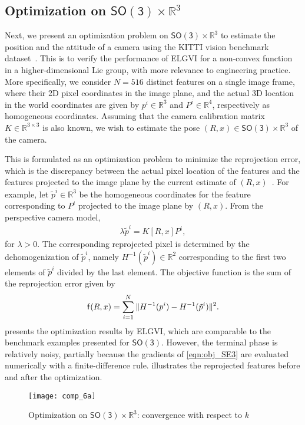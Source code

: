 \documentclass[letterpaper, 10pt, conference]{ieeeconf}
\newcommand{\SO}{\ensuremath{\mathsf{SO(3)}}}
\renewcommand{\Re}{\ensuremath{\mathbb{R}}}
\begin{document}
\subsection{Optimization on $\SO\times \Re^3$}

Next, we present an optimization problem on $\SO\times\Re^3$ to estimate the position and the attitude of a camera using the KITTI vision benchmark dataset~\cite{Geiger2013IJRR}.
This is to verify the performance of ELGVI for a non-convex function in a higher-dimensional Lie group, with more relevance to engineering practice. 
More specifically, we consider $N=516$ distinct features on a single image frame, where their 2D pixel coordinates in the image plane, and the actual 3D location in the world coordinates are given by $p^i\in\Re^3$ and $P^i\in\Re^4$, respectively as homogeneous coordinates. 
Assuming that the camera calibration matrix $K\in\Re^{3\times 3}$ is also known, we wish to estimate the pose $(R,x)\in\SO\times \Re^3$ of the camera.  

This is formulated as an optimization problem to minimize the reprojection error, which is the discrepancy between the actual pixel location of the features and the features projected to the image plane by the current estimate of $(R,x)$~\cite{ma2012invitation}.
For example, let $\tilde p^i\in\Re^3$ be the homogeneous coordinates for the feature corresponding to $P^i$ projected to the image plane by $(R,x)$. 
From the perspective camera model, 
\begin{align*}
    \lambda \tilde p^i = K[R, x]P^i,
\end{align*}
for $\lambda >0$.
The corresponding reprojected pixel is determined by the dehomogenization  of $\tilde p^i$, namely $H^{-1}(\tilde p^i)\in\Re^2$ corresponding to the first two elements of $\tilde p^i$ divided by the last element. 
The objective function is the sum of the reprojection error given by
\begin{align}
    \mathsf{f} (R,x) =  \sum_{i=1}^N \| H^{-1}(p^i) - H^{-1}(\tilde p^i)\|^2.\label{eqn:obj_SE3}
\end{align}
 presents the optimization results by ELGVI, which are comparable to the benchmark examples presented for $\SO$. 
However, the terminal phase is relatively noisy, partially because the gradients of \eqref{eqn:obj_SE3} are evaluated numerically with a finite-difference rule. 
 illustrates the reprojected features before and after the optimization. 

\begin{figure}
    \centerline{
        \texttt{[image: comp\_6a]}
    }
    \caption{Optimization on $\SO\times\Re^3$: convergence with respect to $k$}\label{fig:comp_6}
\end{figure}
\end{document}
